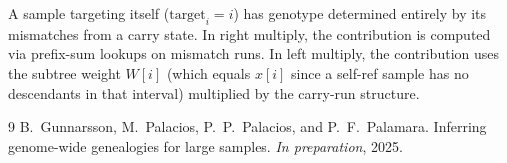 \documentclass[11pt]{article}
\begin{document}
A sample targeting itself ($\text{target}_i = i$) has genotype determined
entirely by its mismatches from a carry state.  In right multiply, the
contribution is computed via prefix-sum lookups on mismatch runs.  In left
multiply, the contribution uses the subtree weight $W[i]$ (which equals
$x[i]$ since a self-ref sample has no descendants in that interval)
multiplied by the carry-run structure.

\begin{thebibliography}{9}
B.~Gunnarsson, M.~Palacios, P.~P.~Palacios, and P.~F.~Palamara.
\newblock Inferring genome-wide genealogies for large samples.
\newblock \emph{In preparation}, 2025.
\end{thebibliography}
\end{document}
